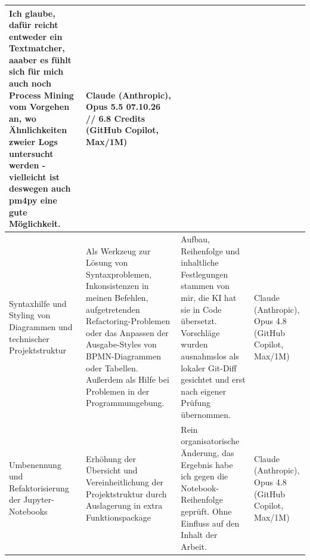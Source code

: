 \begin{landscape}
\begin{longtable}{|p{6.5cm}|p{5cm}|p{8cm}|p{4cm}|}
Ich glaube, dafür reicht entweder ein Textmatcher, aaaber es fühlt sich für mich auch noch Process Mining vom Vorgehen an, wo Ähnlichkeiten zweier Logs untersucht werden - vielleicht ist deswegen auch pm4py eine gute Möglichkeit. &
Claude (Anthropic), Opus 5.5 07.10.26 // 6.8 Credits (GitHub Copilot, Max/1M) \\
\hline
Syntaxhilfe und Styling von Diagrammen und technischer Projektstruktur &
Als Werkzeug zur Lösung von Syntaxproblemen, Inkonsistenzen in meinen Befehlen, aufgetretenden Refactoring-Problemen oder das Anpassen der Ausgabe-Styles von BPMN-Diagrammen oder Tabellen. Außerdem als Hilfe bei Problemen in der Programmumgebung. &
Aufbau, Reihenfolge und inhaltliche Festlegungen stammen von mir, die KI hat sie in Code übersetzt. Vorschläge wurden ausnahmslos als lokaler Git-Diff gesichtet und erst nach eigener Prüfung übernommen. &
Claude (Anthropic), Opus 4.8 (GitHub Copilot, Max/1M) \\
\hline
Umbenennung und Refaktorisierung der Jupyter-Notebooks &
Erhöhung der Übersicht und Vereinheitlichung der Projektstruktur durch Auslagerung in extra Funktionspackage &
Rein organisatorische Änderung, das Ergebnis habe ich gegen die Notebook-Reihenfolge geprüft. Ohne Einfluss auf den Inhalt der Arbeit. &
Claude (Anthropic), Opus 4.8 (GitHub Copilot, Max/1M) \\
\hline
\end{longtable}
\end{landscape}
